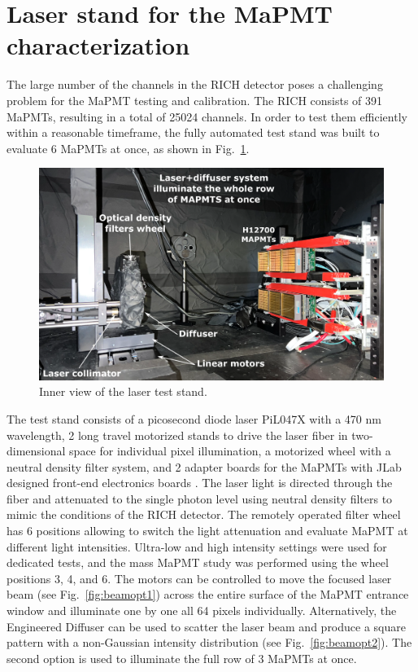 
\section{Laser stand for the MaPMT characterization}
The large number of the channels in the RICH detector  poses a challenging problem for the MaPMT testing and calibration.
The RICH consists of 391 MaPMTs, resulting in a total of 25024 channels. In order to test them efficiently within a reasonable timeframe, the fully automated test stand was built to evaluate 6 MaPMTs at once, as shown in Fig.~\ref{fig:MAPMTtest}.

\begin{figure}[hbt]
	\centering
	\includegraphics[width=0.95\linewidth]{figures/LaserSetup.png}
	\caption{Inner view of the laser test stand.}
	\label{fig:MAPMTtest}
\end{figure}

The test stand consists of a picosecond diode  laser PiL047X with a 470 nm wavelength, 2 long travel motorized stands to drive the laser fiber in two-dimensional space for individual pixel illumination, a motorized wheel with a neutral density filter system, and 2 adapter boards for the MaPMTs with JLab designed front-end electronics boards \cite{Contalbrigo:2020}.
The laser light is directed through the fiber and attenuated to the single photon level using neutral density filters to mimic the conditions of the RICH detector.
The remotely operated filter wheel has 6 positions allowing to switch the light attenuation and evaluate MaPMT at different light intensities. Ultra-low and high intensity settings were used for dedicated tests, and the mass MaPMT study was performed using the wheel positions 3, 4, and 6.
The motors can be controlled to move the focused laser beam (see Fig.~\ref{fig:beamopt1}) across the entire surface of the MaPMT entrance window and illuminate one by one all 64 pixels individually.
Alternatively, the Engineered Diffuser can be used to scatter the laser beam and produce a square pattern with a non-Gaussian intensity distribution (see Fig.~\ref{fig:beamopt2}). 
The second option is used to illuminate the full row of 3 MaPMTs at once.

